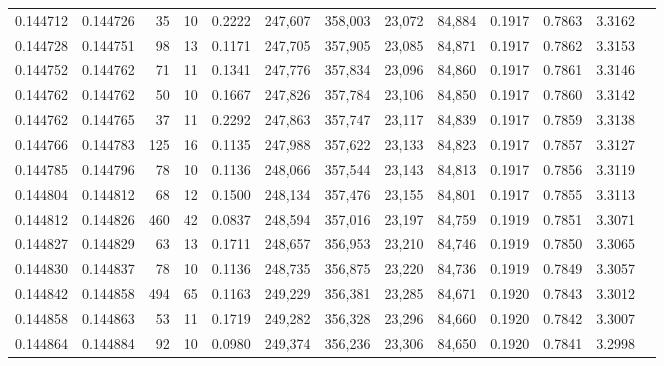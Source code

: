 \begin{tabular}{rrrrrrrrrrrrr}
0.144712 & 0.144726 &    35 &  10 &                                     0.2222 & 247,607 & 358,003 &  23,072 &  84,884 & 0.1917 & 0.7863 & 3.3162 \\
0.144728 & 0.144751 &    98 &  13 &                                     0.1171 & 247,705 & 357,905 &  23,085 &  84,871 & 0.1917 & 0.7862 & 3.3153 \\
0.144752 & 0.144762 &    71 &  11 &                                     0.1341 & 247,776 & 357,834 &  23,096 &  84,860 & 0.1917 & 0.7861 & 3.3146 \\
0.144762 & 0.144762 &    50 &  10 &                                     0.1667 & 247,826 & 357,784 &  23,106 &  84,850 & 0.1917 & 0.7860 & 3.3142 \\
0.144762 & 0.144765 &    37 &  11 &                                     0.2292 & 247,863 & 357,747 &  23,117 &  84,839 & 0.1917 & 0.7859 & 3.3138 \\
0.144766 & 0.144783 &   125 &  16 &                                     0.1135 & 247,988 & 357,622 &  23,133 &  84,823 & 0.1917 & 0.7857 & 3.3127 \\
0.144785 & 0.144796 &    78 &  10 &                                     0.1136 & 248,066 & 357,544 &  23,143 &  84,813 & 0.1917 & 0.7856 & 3.3119 \\
0.144804 & 0.144812 &    68 &  12 &                                     0.1500 & 248,134 & 357,476 &  23,155 &  84,801 & 0.1917 & 0.7855 & 3.3113 \\
0.144812 & 0.144826 &   460 &  42 &                                     0.0837 & 248,594 & 357,016 &  23,197 &  84,759 & 0.1919 & 0.7851 & 3.3071 \\
0.144827 & 0.144829 &    63 &  13 &                                     0.1711 & 248,657 & 356,953 &  23,210 &  84,746 & 0.1919 & 0.7850 & 3.3065 \\
0.144830 & 0.144837 &    78 &  10 &                                     0.1136 & 248,735 & 356,875 &  23,220 &  84,736 & 0.1919 & 0.7849 & 3.3057 \\
0.144842 & 0.144858 &   494 &  65 &                                     0.1163 & 249,229 & 356,381 &  23,285 &  84,671 & 0.1920 & 0.7843 & 3.3012 \\
0.144858 & 0.144863 &    53 &  11 &                                     0.1719 & 249,282 & 356,328 &  23,296 &  84,660 & 0.1920 & 0.7842 & 3.3007 \\
0.144864 & 0.144884 &    92 &  10 &                                     0.0980 & 249,374 & 356,236 &  23,306 &  84,650 & 0.1920 & 0.7841 & 3.2998 \\

\end{tabular}
